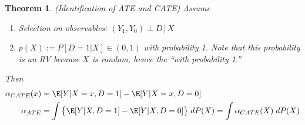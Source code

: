 \documentclass[12pt]{article}
\theoremstyle{plain}
\newtheorem{thm}{Theorem}[section]
\theoremstyle{definition}
\theoremstyle{remark}
\begin{document}
\begin{thm}
\emph{(Identification of ATE and CATE)}
Assume
\begin{enumerate}
  \item Selection on observables: $(Y_1,Y_0)\perp D \,|\, X$
  \item $p(X):=P[D=1|X]\in (0,1)$ with probability 1.
    Note that this probability is an RV because $X$ is random, hence the
    ``with probability 1.''
\end{enumerate}
Then
\begin{align*}
  \alpha_{CATE}(x)
  &=
  \E[Y|X=x,D=1]
  -
  \E[Y|X=x,D=0]
  \\
  \alpha_{ATE}
  &=
  \int
  \big\{
  \E[Y|X,D=1]
  -
  \E[Y|X,D=0]
  \big\}
  \;
  dP(X)
  =
  \int
  \alpha_{CATE}(X)
  \;
  dP(X)
\end{align*}
\end{thm}
\end{document}

